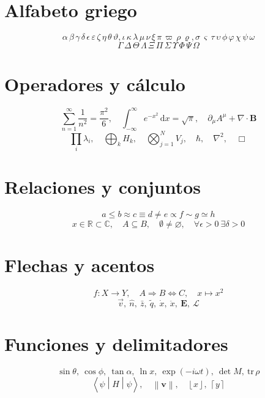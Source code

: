 
\section*{Alfabeto griego}
\[
\alpha\,\beta\,\gamma\,\delta\,\epsilon\,\varepsilon\,\zeta\,\eta\,\theta\,\vartheta,
\iota\,\kappa\,\lambda\,\mu\,\nu\,\xi\,\pi\,\varpi\,\rho\,\varrho,
\sigma\,\varsigma\,\tau\,\upsilon\,\phi\,\varphi\,\chi\,\psi\,\omega
\]
\[
\Gamma\,\Delta\,\Theta\,\Lambda\,\Xi\,\Pi\,\Sigma\,\Upsilon\,\Phi\,\Psi\,\Omega
\]

\section*{Operadores y cálculo}
\[
\sum_{n=1}^{\infty} \frac{1}{n^2}
= \frac{\pi^2}{6},
\quad
\int_{-\infty}^{\infty} e^{-x^2}\,\mathrm{d}x = \sqrt{\pi},
\quad
\partial_\mu A^\mu + \nabla\cdot\mathbf{B}
\]
\[
\prod_i \lambda_i,\quad
\bigoplus_k H_k,\quad
\bigotimes_{j=1}^{N} V_j,\quad
\hbar,\quad \nabla^2,\quad \Box
\]

\section*{Relaciones y conjuntos}
\[
a \leq b \approx c \equiv d \neq e \propto f \sim g \simeq h
\]
\[
x \in \mathbb{R} \subset \mathbb{C},\quad
A \subseteq B,\quad
\emptyset \neq \varnothing,\quad
\forall \epsilon > 0\ \exists \delta > 0
\]

\section*{Flechas y acentos}
\[
f\colon X \to Y,\quad
A \Rightarrow B \Leftrightarrow C,\quad
x \mapsto x^2
\]
\[
\vec{v},\ \hat{n},\ \bar{z},\ \tilde{q},\ \dot{x},\ \ddot{x},\ \mathbf{E},\ \mathcal{L}
\]

\section*{Funciones y delimitadores}
\[
\sin\theta,\ \cos\phi,\ \tan\alpha,\ \ln x,\ \exp(-i\omega t),\ \det M,\ \mathrm{tr}\,\rho
\]
\[
\left\langle \psi \middle| \hat{H} \middle| \psi \right\rangle,\quad
\left\lVert \mathbf{v} \right\rVert,\quad
\left\lfloor x \right\rfloor,\ \left\lceil y \right\rceil
\]
